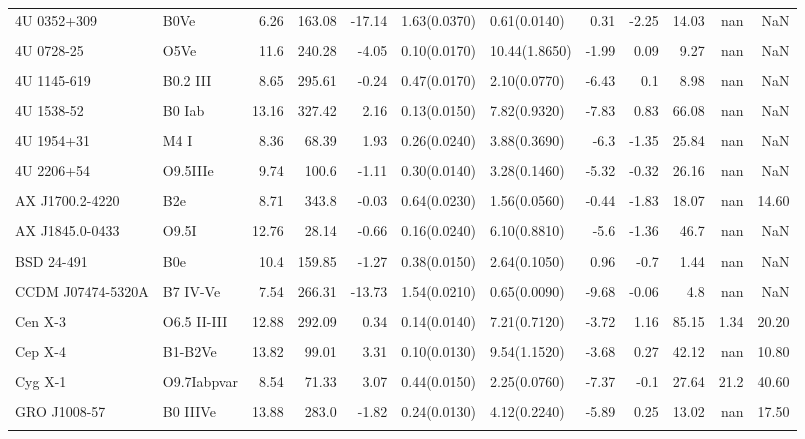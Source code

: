 \begin{longtable}{llrrrllrrrrr}
4U 0352+309 & B0Ve & 6.26 & 163.08 & -17.14 & 1.63(0.0370) & 0.61(0.0140) & 0.31 & -2.25 & 14.03 & nan & NaN \\ \\
4U 0728-25 & O5Ve & 11.6 & 240.28 & -4.05 & 0.10(0.0170) & 10.44(1.8650) & -1.99 & 0.09 & 9.27 & nan & NaN \\ \\
4U 1145-619 & B0.2 III & 8.65 & 295.61 & -0.24 & 0.47(0.0170) & 2.10(0.0770) & -6.43 & 0.1 & 8.98 & nan & NaN \\ \\
4U 1538-52 & B0 Iab & 13.16 & 327.42 & 2.16 & 0.13(0.0150) & 7.82(0.9320) & -7.83 & 0.83 & 66.08 & nan & NaN \\ \\
4U 1954+31 & M4 I & 8.36 & 68.39 & 1.93 & 0.26(0.0240) & 3.88(0.3690) & -6.3 & -1.35 & 25.84 & nan & NaN \\ \\
4U 2206+54 & O9.5IIIe & 9.74 & 100.6 & -1.11 & 0.30(0.0140) & 3.28(0.1460) & -5.32 & -0.32 & 26.16 & nan & NaN \\ \\
AX J1700.2-4220 & B2e & 8.71 & 343.8 & -0.03 & 0.64(0.0230) & 1.56(0.0560) & -0.44 & -1.83 & 18.07 & nan & 14.60 \\ \\
AX J1845.0-0433 & O9.5I & 12.76 & 28.14 & -0.66 & 0.16(0.0240) & 6.10(0.8810) & -5.6 & -1.36 & 46.7 & nan & NaN \\ \\
BSD 24-491 & B0e & 10.4 & 159.85 & -1.27 & 0.38(0.0150) & 2.64(0.1050) & 0.96 & -0.7 & 1.44 & nan & NaN \\ \\
CCDM J07474-5320A & B7 IV-Ve & 7.54 & 266.31 & -13.73 & 1.54(0.0210) & 0.65(0.0090) & -9.68 & -0.06 & 4.8 & nan & NaN \\ \\
Cen X-3 & O6.5 II-III & 12.88 & 292.09 & 0.34 & 0.14(0.0140) & 7.21(0.7120) & -3.72 & 1.16 & 85.15 & 1.34 & 20.20 \\ \\
Cep X-4 & B1-B2Ve & 13.82 & 99.01 & 3.31 & 0.10(0.0130) & 9.54(1.1520) & -3.68 & 0.27 & 42.12 & nan & 10.80 \\ \\
Cyg X-1 & O9.7Iabpvar & 8.54 & 71.33 & 3.07 & 0.44(0.0150) & 2.25(0.0760) & -7.37 & -0.1 & 27.64 & 21.2 & 40.60 \\ \\
GRO J1008-57 & B0 IIIVe & 13.88 & 283.0 & -1.82 & 0.24(0.0130) & 4.12(0.2240) & -5.89 & 0.25 & 13.02 & nan & 17.50 \\ \\

\end{longtable}
